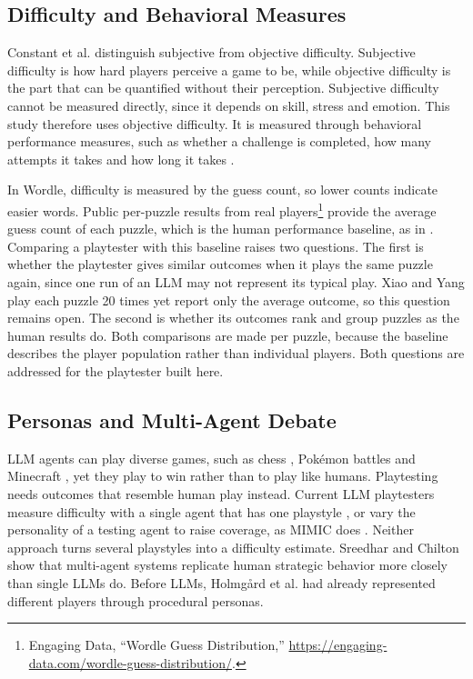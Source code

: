 \documentclass[conference]{IEEEtran}
\begin{document}
\subsection{Difficulty and Behavioral Measures}
Constant et al. \cite{constant2017} distinguish subjective from objective difficulty. Subjective difficulty is how hard players perceive a game to be, while objective difficulty is the part that can be quantified without their perception. Subjective difficulty cannot be measured directly, since it depends on skill, stress and emotion. This study therefore uses objective difficulty. It is measured through behavioral performance measures, such as whether a challenge is completed, how many attempts it takes and how long it takes \cite{weber2020,romero2023}.

In Wordle, difficulty is measured by the guess count, so lower counts indicate easier words. Public per-puzzle results from real players\footnote{Engaging Data, ``Wordle Guess Distribution,'' \url{https://engaging-data.com/wordle-guess-distribution/}.} provide the average guess count of each puzzle, which is the human performance baseline, as in \cite{xiao2025}. Comparing a playtester with this baseline raises two questions. The first is whether the playtester gives similar outcomes when it plays the same puzzle again, since one run of an LLM may not represent its typical play. Xiao and Yang \cite{xiao2025} play each puzzle 20 times yet report only the average outcome, so this question remains open. The second is whether its outcomes rank and group puzzles as the human results do. Both comparisons are made per puzzle, because the baseline describes the player population rather than individual players. Both questions are addressed for the playtester built here.

\subsection{Personas and Multi-Agent Debate}
LLM agents can play diverse games, such as chess \cite{feng2023}, Pokémon battles \cite{hu2024} and Minecraft \cite{wang2023}, yet they play to win rather than to play like humans. Playtesting needs outcomes that resemble human play instead. Current LLM playtesters measure difficulty with a single agent that has one playstyle \cite{xiao2025}, or vary the personality of a testing agent to raise coverage, as MIMIC does \cite{chen2025}. Neither approach turns several playstyles into a difficulty estimate. Sreedhar and Chilton \cite{sreedhar2025} show that multi-agent systems replicate human strategic behavior more closely than single LLMs do. Before LLMs, Holmgård et al. \cite{holmgard2019} had already represented different players through procedural personas.
\end{document}
